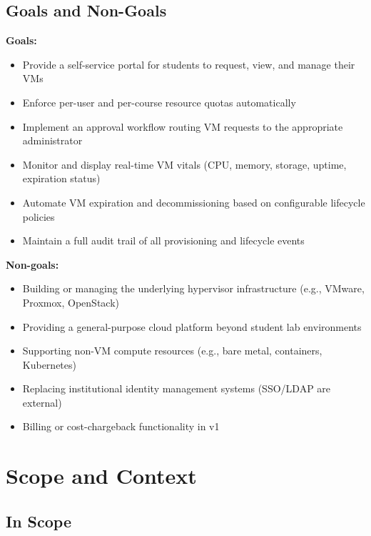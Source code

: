 \documentclass[12pt,letterpaper]{article}
\begin{document}
\subsection{Goals and Non-Goals}

\textbf{Goals:}
\begin{itemize}
  \item Provide a self-service portal for students to request, view, and manage their VMs
  \item Enforce per-user and per-course resource quotas automatically
  \item Implement an approval workflow routing VM requests to the appropriate administrator
  \item Monitor and display real-time VM vitals (CPU, memory, storage, uptime, expiration status)
  \item Automate VM expiration and decommissioning based on configurable lifecycle policies
  \item Maintain a full audit trail of all provisioning and lifecycle events
\end{itemize}

\textbf{Non-goals:}
\begin{itemize}
  \item Building or managing the underlying hypervisor infrastructure (e.g., VMware, Proxmox, OpenStack)
  \item Providing a general-purpose cloud platform beyond student lab environments
  \item Supporting non-VM compute resources (e.g., bare metal, containers, Kubernetes)
  \item Replacing institutional identity management systems (SSO/LDAP are external)
  \item Billing or cost-chargeback functionality in v1
\end{itemize}

\section{Scope and Context}

\subsection{In Scope}
\end{document}
